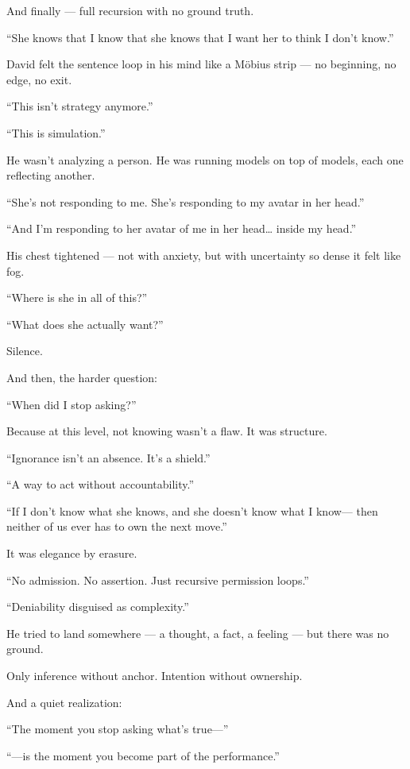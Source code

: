 \medskip






And finally — full recursion with no ground truth.

“She knows that I know that she knows that I want her to think I don’t know.”

David felt the sentence loop in his mind like a Möbius strip — no beginning, no edge, no exit.

“This isn’t strategy anymore.”

“This is simulation.”

He wasn’t analyzing a person. He was running models on top of models, each one reflecting another.

“She’s not responding to me.
She’s responding to my avatar in her head.”

“And I’m responding to her avatar of me in her head… inside my head.”

His chest tightened — not with anxiety, but with uncertainty so dense it felt like fog.

“Where is she in all of this?”

“What does she actually want?”

Silence.

And then, the harder question:

“When did I stop asking?”

Because at this level, not knowing wasn’t a flaw. It was structure.

“Ignorance isn’t an absence. It’s a shield.”

“A way to act without accountability.”

“If I don’t know what she knows, and she doesn’t know what I know—
then neither of us ever has to own the next move.”

It was elegance by erasure.

“No admission. No assertion. Just recursive permission loops.”

“Deniability disguised as complexity.”

He tried to land somewhere — a thought, a fact, a feeling — but there was no ground.

Only inference without anchor. Intention without ownership.

And a quiet realization:

“The moment you stop asking what’s true—”

“—is the moment you become part of the performance.”

